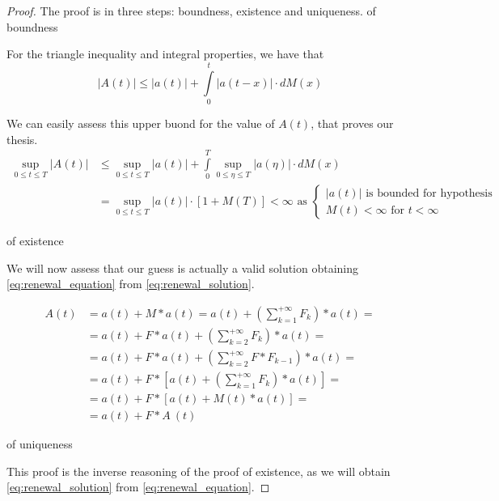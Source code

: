 \begin{proof}
	The proof is in three steps: boundness, existence and uniqueness.
	\proofpart of boundness \label{req:boundness}

	For the triangle inequality and integral properties, we have that
	$$ |A(t)| \le |a(t)| + \int\limits_0^{t}|a(t-x)| \cdot dM(x) $$

	We can easily assess this upper buond for the value of $A(t)$, that proves our thesis.
	\begin{equation}\begin{split}
		\sup_{0\le t \le T} |A(t)| & \le \sup_{0\le t \le T} |a(t)| + \int\limits_0^{T}\sup_{0\le \eta \le T}|a(\eta)| \cdot dM(x) \\
		& = \sup_{0\le t \le T} |a(t)| \cdot [ 1+M(T) ] < \infty \text{ as }
		\begin{cases}
			|a(t)| \text{ is bounded for hypothesis} \\
			M(t) < \infty \text{ for } t<\infty
		\end{cases}
	\end{split}\end{equation}

	\proofpart of existence

		We will now assess that our guess is actually a valid solution obtaining \ref{eq:renewal_equation} from \ref{eq:renewal_solution}.

		\begin{equation}\begin{split}
			A(t) &= a(t) + M \ast a(t) = a(t) + \left(\sum\limits_{k=1}^{+\infty} F_k \right) \ast a(t) = \\
			&= a(t) + F \ast a(t) +\left(\sum\limits_{k=2}^{+\infty} F_k \right) \ast a(t) = \\
			&= a(t) + F \ast a(t) +\left(\sum\limits_{k=2}^{+\infty} F \ast F_{k-1} \right) \ast a(t) = \\
			&= a(t) + F \ast \left[ a(t) + \left(\sum\limits_{k=1}^{+\infty} F_k \right) \ast a(t) \right] = \\
			&= a(t) + F \ast \left[ a(t) + M(t) \ast a(t) \right] = \\
			&=a(t) + F \ast A ~ (t)
		\end{split}\end{equation}

	\proofpart of uniqueness

	This proof is the inverse reasoning of the proof of existence, as we will obtain \ref{eq:renewal_solution} from \ref{eq:renewal_equation}.


\end{proof}
